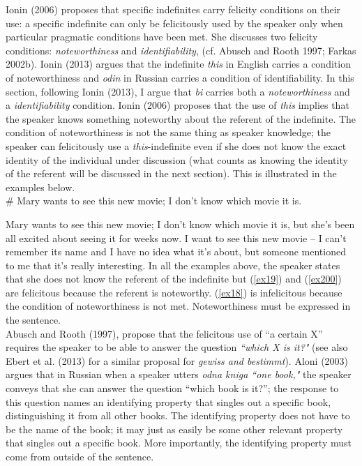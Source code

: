 \documentclass[output=paper,
modfonts
]{langsci/langscibook}
\begin{document}
Ionin (2006) proposes that specific indefinites carry felicity conditions on their use: a specific indefinite can only be felicitously used by the speaker only when particular pragmatic conditions have been met. She discusses two felicity conditions: \emph{noteworthiness} and \emph{identifiability}, (cf. Abusch and Rooth 1997; Farkas 2002b). Ionin (2013) argues that the indefinite \emph{this} in English carries a condition of noteworthiness and \emph{odin} in Russian carries a condition of identifiability. In this section, following Ionin (2013), I  argue that \emph{bi} carries both a \emph{noteworthiness} and a \emph{identifiability} condition. Ionin (2006) proposes that the use of \emph{this} implies that the speaker knows something noteworthy about the referent of the indefinite. The condition of noteworthiness is not the same thing as speaker knowledge; the speaker can felicitously use a \emph{this}-indefinite even if she does not know the exact identity of the individual under discussion (what counts as knowing the identity of the referent will be discussed in the next section). This is illustrated in the examples below. 
\ea {}\\
\ea\label{ex18} \# Mary wants to see this new movie; I don’t know which movie it is.

\ex\label{ex19}
 Mary wants to see this new movie; I don’t know which movie it is, but she’s been all excited about seeing it for weeks now.
\ex\label{ex200}
I want to see this new movie – I can’t remember its name and I have no idea what it’s about, but someone mentioned to me that it’s really interesting.
\z\z In all the examples above, the speaker states that she does not know the referent of the indefinite but (\ref{ex19}) and (\ref{ex200}) are felicitous because the referent is noteworthy. (\ref{ex18}) is infelicitous because the condition of noteworthiness is not met. Noteworthiness must be expressed in the sentence. \\
Abusch and Rooth (1997), propose that the felicitous use of  ``a certain X” requires the speaker to be able to answer the question \emph{``which X is it?"} (see also Ebert et al. (2013) for a similar proposal for \emph{gewiss and bestimmt}). Aloni (2003) argues that in Russian when a  speaker utters \emph{odna kniga ``one book,"} the speaker conveys that she can answer the question ``which book is it?”; the response to this question names an identifying property that singles out a specific book, distinguishing it from all other books. The identifying property does not have to be the name of the book; it may just as easily be some other relevant property that singles out a specific book. More importantly, the identifying property must come from outside of the sentence.
\end{document}
